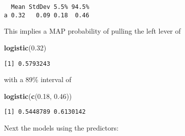 \documentclass[]{tufte-handout}
\newenvironment{Shaded}{}{}
\newcommand{\KeywordTok}[1]{\textcolor[rgb]{0.00,0.44,0.13}{\textbf{#1}}}
\newcommand{\FloatTok}[1]{\textcolor[rgb]{0.25,0.63,0.44}{#1}}
\newcommand{\NormalTok}[1]{#1}
\begin{document}
\begin{verbatim}
  Mean StdDev 5.5% 94.5%
a 0.32   0.09 0.18  0.46
\end{verbatim}

This implies a MAP probability of pulling the left lever of

\begin{Shaded}
\begin{Highlighting}[]
\KeywordTok{logistic}\NormalTok{(}\FloatTok{0.32}\NormalTok{)}
\end{Highlighting}
\end{Shaded}

\begin{verbatim}
[1] 0.5793243
\end{verbatim}

with a 89\% interval of

\begin{Shaded}
\begin{Highlighting}[]
\KeywordTok{logistic}\NormalTok{(}\KeywordTok{c}\NormalTok{(}\FloatTok{0.18}\NormalTok{, }\FloatTok{0.46}\NormalTok{))}
\end{Highlighting}
\end{Shaded}

\begin{verbatim}
[1] 0.5448789 0.6130142
\end{verbatim}

Next the models using the predictors:
\end{document}
